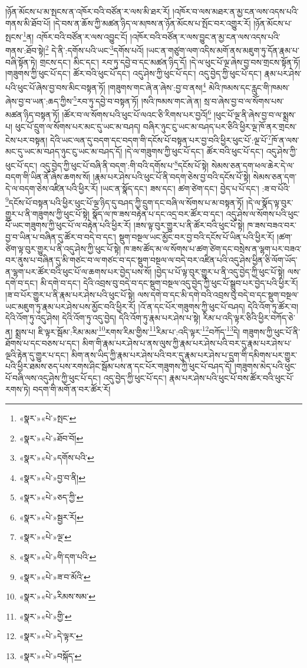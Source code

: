 །ཉོན་མོངས་པ་མ་སྤངས་ན་འཁོར་བའི་བཙོན་ར་ལས་མི་ཐར་རོ། །འཁོར་བ་ལས་མཐར་ན་མྱ་ངན་ལས་འདས་པའི་གནས་མི་ཐོབ་པོ། །དེ་བས་ན་ཆོས་ཀྱི་མཚན་ཉིད་ལ་མཁས་ན་ཉོན་མོངས་པ་སྤོང་བར་འགྱུར་རོ། །ཉོན་མོངས་པ་སྤངས་\footnote{«སྣར་»«པེ་»སྤང་}ན། འཁོར་བའི་བཙོན་ར་ལས་འབྱུང་ངོ། །འཁོར་བའི་བཙོན་ར་ལས་བྱུང་ན་མྱ་ངན་ལས་འདས་པའི་གནས་:ཐོབ་སྟེ།\footnote{«སྣར་»«པེ་»ཐོབ་བོ།} དེ་ནི་:དགོས་པའི་ཡང་\footnote{«སྣར་»«པེ་»དགོས་པའི་}དགོས་པའོ། །ཡང་ན་གཙུག་ལག་འདིས་མགོ་ནས་མཇུག་ཏུ་དོན་རྣམ་པ་བཞི་སྟོན་ཏེ། གྲངས་དང་། མིང་དང་། རབ་ཏུ་དབྱེ་བ་དང་མཚན་ཉིད་དོ། །དེ་ལ་ཕུང་པོ་ལྔ་ཞེས་བྱ་བས་གྲངས་སྟོན་ཏོ། །གཟུགས་ཀྱི་ཕུང་པོ་དང་། ཚོར་བའི་ཕུང་པོ་དང་། འདུ་ཤེས་ཀྱི་ཕུང་པོ་དང་། འདུ་བྱེད་ཀྱི་ཕུང་པོ་དང་། རྣམ་པར་ཤེས་པའི་ཕུང་པོ་ཞེས་བྱ་བས་མིང་བསྟན་ཏོ། །གཟུགས་གང་ཞེ་ན་ཞེས་:བྱ་བ་ནས།\footnote{«སྣར་»«པེ་»བྱ་བ་ནི།} མེའི་ཁམས་དང་རླུང་གི་ཁམས་ཞེས་བྱ་བ་ཡན་:ཆད་ཀྱིས་\footnote{«སྣར་»«པེ་»ཅད་ཀྱི་}རབ་ཏུ་དབྱེ་བ་བསྟན་ཏོ། །སའི་ཁམས་གང་ཞེ་ན། སྲ་བ་ཞེས་བྱ་བ་ལ་སོགས་པས་མཚན་ཉིད་བསྟན་ཏོ། །ཚོར་བ་ལ་སོགས་པའི་ཕུང་པོ་ལའང་ཅི་རིགས་པར་བྱའོ།\footnote{«སྣར་»«པེ་»སྦྱར་རོ།} །ཕུང་པོ་ལྔ་ནི་ཞེས་བྱ་བ་ལ་སྨྲས་པ། ཕུང་པོ་དྲུག་ལ་སོགས་པར་མང་དུ་ཡང་མ་བཤད། བཞིར་ཉུང་ངུ་ཡང་མ་བཤད་པར་ཅིའི་ཕྱིར་ལྔ་ཁོ་ནར་གྲངས་ངེས་པར་བསྟན། དེའི་ཡང་ལན་དུ་བདག་དང་བདག་གི་དངོས་པོ་བསྟན་པར་བྱ་བའི་ཕྱིར་ཕུང་པོ་:ལྔ་པོ་\footnote{«སྣར་»«པེ་»ལྔ་}ཁོ་ན་ལས་མང་དུ་ཡང་མ་བཤད་ཉུང་ངུ་ཡང་མ་བཤད་དོ། །དེ་ལ་གཟུགས་ཀྱི་ཕུང་པོ་དང་། ཚོར་བའི་ཕུང་པོ་དང་། འདུ་ཤེས་ཀྱི་ཕུང་པོ་དང་། འདུ་བྱེད་ཀྱི་ཕུང་པོ་བཞི་ནི་བདག་:གི་བའི་དགོས་པ་\footnote{«སྣར་»«པེ་»གི་དག་པའི་}དངོས་པོ་སྟེ། སེམས་ཅན་དག་ཕལ་ཆེར་དེ་ལ་བདག་གི་ཡིན་ནོ་ཞེས་ཆགས་སོ། །རྣམ་པར་ཤེས་པའི་ཕུང་པོ་ནི་བདག་ཅེས་བྱ་བའི་དངོས་པོ་སྟེ། སེམས་ཅན་དག་དེ་ལ་བདག་ཅེས་འཛིན་པའི་ཕྱིར་རོ། །ཡང་ན་སྣོད་དང་། ཟས་དང་། ཚག་ཙེག་དང་། བྱེད་པ་པོ་དང་། :ཟ་བ་པོའི་\footnote{«སྣར་»«པེ་»ཟ་བ་མོའི་}དངོས་པོ་བསྟན་པའི་ཕྱིར་ཕུང་པོ་ལྔ་ཉིད་དུ་བཤད་ཀྱི་དྲུག་དང་བཞི་ལ་སོགས་པ་མ་བསྟན་ཏོ། །དེ་ལ་སྣོད་ལྟ་བུར་གྱུར་པ་ནི་གཟུགས་ཀྱི་ཕུང་པོ་སྟེ། སྣོད་ལ་ཁ་ཟས་བརྟེན་པ་དང་འདྲ་བར་ཚོར་བ་དང་། འདུ་ཤེས་ལ་སོགས་པའི་ཕུང་པོ་ཡང་གཟུགས་ཀྱི་ཕུང་པོ་ལ་བརྟེན་པའི་ཕྱིར་རོ། །ཟས་ལྟ་བུར་གྱུར་པ་ནི་ཚོར་བའི་ཕུང་པོ་སྟེ། ཁ་ཟས་བཟའ་བར་བྱ་བ་ཡིན་པ་བཞིན་དུ་ཚོར་བ་བདེ་བ་དང་། སྡུག་བསྔལ་ཡང་མྱོང་བར་བྱ་བའི་དངོས་པོ་ཡིན་པའི་ཕྱིར་རོ། །ཚག་ཙེག་ལྟ་བུར་གྱུར་པ་ནི་འདུ་ཤེས་ཀྱི་ཕུང་པོ་སྟེ། ཁ་ཟས་ཚོད་མ་ལ་སོགས་པ་ཚག་ཙེག་དང་བསྲེས་ན་ལྷག་པར་བཟའ་བར་ནུས་པ་བཞིན་དུ་མི་གཙང་བ་ལ་གཙང་བ་དང་སྡུག་བསྔལ་ལ་བདེ་བར་འཛིན་པའི་འདུ་ཤེས་ཕྱིན་ཅི་ལོག་ཡོད་ན་ལྷག་པར་ཚོར་བའི་ཕུང་པོ་ལ་ཆགས་པར་བྱེད་པས་སོ། །བྱེད་པ་པོ་ལྟ་བུར་གྱུར་པ་ནི་འདུ་བྱེད་ཀྱི་ཕུང་པོ་སྟེ། ལས་དགེ་བ་དང་། མི་དགེ་བ་དང་། དེའི་འབྲས་བུ་བདེ་བ་དང་སྡུག་བསྔལ་འདུ་བྱེད་ཀྱི་ཕུང་པོ་སྒྲུབ་པར་བྱེད་པའི་ཕྱིར་རོ། །ཟ་བ་པོར་གྱུར་པ་ནི་རྣམ་པར་ཤེས་པའི་ཕུང་པོ་སྟེ། ལས་དགེ་བ་དང་མི་དགེ་བའི་འབྲས་བུ་བདེ་བ་དང་སྡུག་བསྔལ་ཡང་མཇུག་ཏུ་རྣམ་པར་ཤེས་པས་མྱོང་བའི་ཕྱིར་རོ། །འོ་ན་དང་པོར་གཟུགས་ཀྱི་ཕུང་པོ་བཤད། དེའི་འོག་ཏུ་ཚོར་བ། དེའི་འོག་ཏུ་འདུ་ཤེས། དེའི་འོག་ཏུ་འདུ་བྱེད། དེའི་འོག་ཏུ་རྣམ་པར་ཤེས་པ་སྟེ། རིམ་པ་འདི་ལྟར་ཅིའི་ཕྱིར་བཀོད་ཅེ་ན། སྨྲས་པ། ཇི་ལྟར་སྦོམ་:རིམ་མམ་\footnote{«སྣར་»«པེ་»རིམས་སམ་}རགས་རིམ་གྱིས་\footnote{«སྣར་»«པེ་»གྱི་}རིམ་པ་:འདི་ལྟར་\footnote{«སྣར་»«པེ་»དེ་ལྟར་}བཀོད་\footnote{«སྣར་»«པེ་»བསྐོད་}དེ། གཟུགས་ཀྱི་ཕུང་པོ་ནི་ཐོགས་པ་དང་བཅས་པ་དང་། མིག་གི་རྣམ་པར་ཤེས་པ་ནས་ལུས་ཀྱི་རྣམ་པར་ཤེས་པའི་བར་དུ་རྣམ་པར་ཤེས་པ་ལྔའི་རྟེན་དུ་གྱུར་པ་དང་། མིག་ནས་ཡིད་ཀྱི་རྣམ་པར་ཤེས་པའི་བར་དུ་རྣམ་པར་ཤེས་པ་དྲུག་གི་དམིགས་པར་གྱུར་པའི་ཕྱིར་ཐམས་ཅད་པས་རགས་ཤིང་སྦོམ་པས་ན་དང་པོར་གཟུགས་ཀྱི་ཕུང་པོ་བཤད་དོ། །གཟུགས་མེད་པའི་ཕུང་པོ་བཞི་ལས་འདུ་ཤེས་ཀྱི་ཕུང་པོ་དང་། འདུ་བྱེད་ཀྱི་ཕུང་པོ་དང་། རྣམ་པར་ཤེས་པའི་ཕུང་པོ་བས་ཚོར་བའི་ཕུང་པོ་རགས་ཏེ། བདག་གི་མགོ་ན་བར་ཚོར་རོ། 